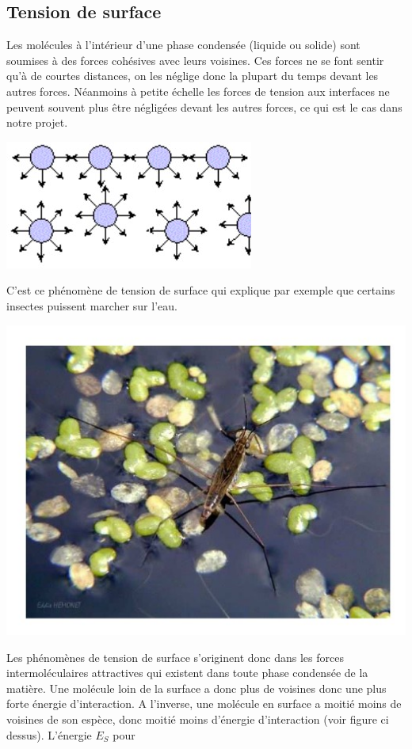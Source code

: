 \documentclass[10pt,a4paper]{article}
\begin{document}
\subsection{Tension de surface}
Les molécules à l'intérieur d’une phase condensée (liquide ou solide) sont soumises à des forces cohésives avec leurs voisines. Ces forces ne se font sentir qu’à de courtes distances, on les néglige donc la plupart du temps devant les autres forces. Néanmoins à petite échelle les forces de tension aux interfaces ne peuvent souvent plus être négligées devant les autres forces, ce qui est le cas dans notre projet.
\begin{center}
\includegraphics[scale=0.8]{images/tension.jpg} 
\end{center}
C'est ce phénomène de tension de surface qui explique par exemple que certains insectes puissent marcher sur l'eau.
\begin{center}
\includegraphics[scale=0.8]{images/insecte.jpg} 
\end{center}
Les phénomènes de tension de surface s'originent donc dans les forces intermoléculaires attractives qui existent dans toute phase condensée de la matière. Une molécule loin de la surface a donc plus de voisines donc une plus forte énergie d’interaction. A l'inverse, une molécule en surface a moitié moins de voisines de son espèce, donc moitié moins d’énergie d’interaction (voir figure ci dessus). L’énergie $E_S$ pour
\end{document}
